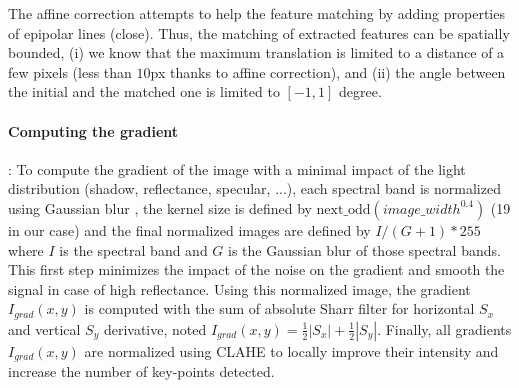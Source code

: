 \documentclass[a4paper,twoside]{article}
\begin{document}
	\par The affine correction attempts to help the feature matching by adding properties of epipolar lines (close).
	Thus, the matching of extracted features can be spatially bounded,
	(i) we know that the maximum translation is limited to a distance of a few pixels (less than $10$px thanks to affine correction),
	and (ii) the angle between the initial and the matched one is limited to $[-1,1]$ degree.
	
	\paragraph{Computing the gradient} : \label{sec:pre-processing}
	To compute the gradient of the image with a minimal impact of the light distribution (shadow, reflectance, specular, ...),
	each spectral band is normalized using Gaussian blur \cite{sage0303}, the kernel size is defined by $\text{next\_odd}(image\_width^{0.4})$ (19 in our case)
	and the final normalized images are defined by $I/(G+1)*255$ where $I$ is the spectral band and $G$ is the Gaussian blur of those spectral bands.
	This first step minimizes the impact of the noise on the gradient and smooth the signal in case of high reflectance.
	Using this normalized image, the gradient $I_{grad}(x,y)$ is computed with the sum of absolute Sharr filter \cite{Seitz}
	for horizontal $S_x$ and vertical $S_y$ derivative, noted $I_{grad}(x,y)=\frac{1}{2}|S_x|+\frac{1}{2}|S_y|$.
	Finally, all gradients $I_{grad}(x,y)$ are normalized using CLAHE \cite{zuiderveld1994contrast} to locally improve their intensity and increase the number of key-points detected.%
	
\end{document}
